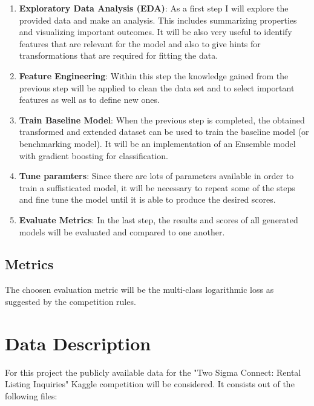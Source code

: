 \documentclass[runningheads]{llncs}
\begin{document}
\begin{enumerate}
    \item \textbf{Exploratory Data Analysis (EDA)}: As a first step I will explore the provided data and make an analysis. This includes summarizing properties and visualizing important outcomes. It will be also very useful to identify features that are relevant for the model and also to give hints for transformations that are required for fitting the data.
    \item \textbf{Feature Engineering}: Within this step the knowledge gained from the previous step will be applied to clean the data set and to select important features as well as to define new ones.
    \item \textbf{Train Baseline Model}: When the previous step is completed, the obtained transformed and extended dataset can be used to train the baseline model (or benchmarking model). It will be an implementation of an Ensemble model with gradient boosting for classification.
    \item \textbf{Tune paramters}: Since there are lots of parameters available in order to train a suffisticated model, it will be necessary to repeat some of the steps and fine tune the model until it is able to produce the desired scores.
    \item \textbf{Evaluate Metrics}: In the last step, the results and scores of all generated models will be evaluated and compared to one another.

    
\end{enumerate}

\subsection{Metrics}
The choosen evaluation metric will be the multi-class logarithmic loss as suggested by the competition rules.


	\newpage
	
	
	\section{Data Description}
	 For this project the publicly available data for the "Two Sigma Connect: Rental Listing Inquiries" Kaggle competition will be considered. It consists out of the following files:
    \newline
    
\end{document}
